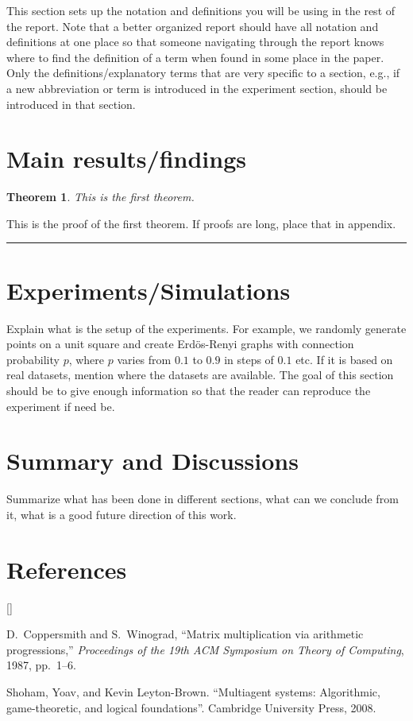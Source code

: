 \documentclass[twoside]{article}
\def\beginrefs{\begin{list}%
        {[\arabic{equation}]}{\usecounter{equation}
         \setlength{\leftmargin}{2.0truecm}\setlength{\labelsep}{0.4truecm}%
         \setlength{\labelwidth}{1.6truecm}}}
\def\endrefs{\end{list}}
\def\bibentry#1{\item[\hbox{[#1]}]}
\newtheorem{theorem}{Theorem}%
\newenvironment{proof}{{\bf Proof:}}{\hfill\rule{2mm}{2mm}}
\begin{document}
This section sets up the notation and definitions you will be using in the rest of the report. Note that a better organized report should have all notation and definitions at one place so that someone navigating through the report knows where to find the definition of a term when found in some place in the paper. Only the definitions/explanatory terms that are very specific to a section, e.g., if a new abbreviation or term is introduced in the experiment section, should be introduced in that section.

\section{Main results/findings}

\begin{theorem}
\label{thm:first}
This is the first theorem.
\end{theorem}

\begin{proof}
This is the proof of the first theorem. If proofs are long, place that in appendix.
\end{proof}


\section{Experiments/Simulations}

Explain what is the setup of the experiments. For example, we randomly generate points on a unit square and create Erd\"os-Renyi graphs with connection probability $p$, where $p$ varies from $0.1$ to $0.9$ in steps of $0.1$ etc. If it is based on real datasets, mention where the datasets are available. The goal of this section should be to give enough information so that the reader can reproduce the experiment if need be.

\section{Summary and Discussions}

Summarize what has been done in different sections, what can we conclude from it, what is a good future direction of this work.

\section*{References}
\beginrefs
\bibentry{CW87}{\sc D.~Coppersmith} and {\sc S.~Winograd}, 
``Matrix multiplication via arithmetic progressions,''
{\it Proceedings of the 19th ACM Symposium on Theory of Computing},
1987, pp.~1--6.
\bibentry{SLB08}Shoham, Yoav, and Kevin Leyton-Brown. ``Multiagent systems: Algorithmic, game-theoretic, and logical foundations''. Cambridge University Press, 2008.
\endrefs
\end{document}

